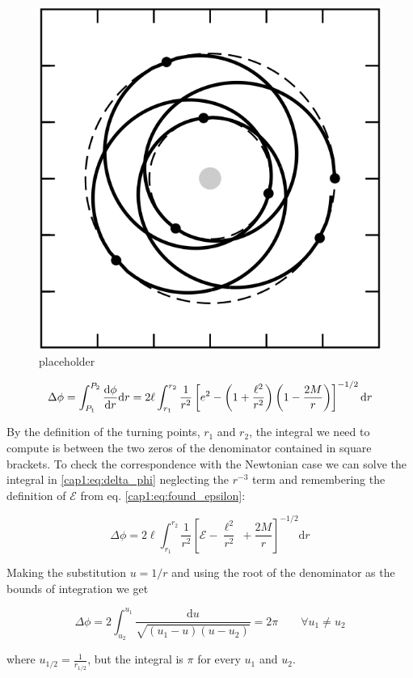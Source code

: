 \begin{figure}[h]
    \centering
    \includegraphics[width = 0.5 \textwidth]{Figures/precession_bozza.png}
    \caption{placeholder}
    \label{cap1:fig:precession}
\end{figure}

\begin{equation}
    \Delta \phi = \int_{P_1}^{P_2} \dv{\phi}{r} \mathrm{d}r
    = 2 \ell \int_{r_1}^{r_2} \frac{1}{r^2}
    \left[e^2 - \left(1 + \frac{\ell^2}{r^2}\right)
    \left(1 - \frac{2M}{r}\right)\right]^{-1/2} \mathrm{d}r
    \label{cap1:eq:delta_phi}
\end{equation}

By the definition of the turning points, $r_1$ and $r_2$, the integral we need
to compute is between the two zeros of the denominator contained in square
brackets.
To check the correspondence with the Newtonian case we can solve the integral
in \ref{cap1:eq:delta_phi} neglecting the $r^{-3}$ term and remembering the
definition of $\mathcal E$ from eq. \ref{cap1:eq:found_epsilon}:

\begin{equation*}
    \Delta \phi = 2 \ell \int_{r_1}^{r_2} \frac{1}{r^2} \left[\mathcal E -
    \frac{\ell^2}{r^2}\ + \frac{2M}{r} \right]^{-1/2} \mathrm{d}r
\end{equation*}

Making the substitution $u = 1 / r$ and using the root of the denominator as
the bounds of integration we get

\begin{equation}
    \Delta \phi
    = 2 \int_{u_2}^{u_1} \frac{\mathrm{d} u}{\sqrt{(u_1 - u)(u - u_2)}} 
    = 2 \pi \quad \quad \forall u_1 \neq u_2
\end{equation}

where $u_{1/2} = \frac{1}{r_{1/2}}$, but the integral is $\pi$ for every $u_1$
and $u_2$.

